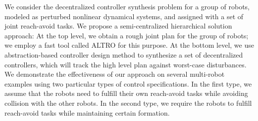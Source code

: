 
We consider the decentralized controller synthesis problem for a group of robots, modeled as perturbed nonlinear dynamical systems, and assigned with a set of joint reach-avoid tasks.
We propose a semi-centralized hierarchical solution approach:
At the top level, we obtain a rough joint plan for the group of robots; we employ a fast tool called ALTRO for this purpose.
At the bottom level, we use abstraction-based controller design method to synthesize a set of decentralized controllers, which will track the high level plan against worst-case disturbances.
We demonstrate the effectiveness of our approach on several multi-robot examples using two particular types of control specifications.
In the first type, we assume that the robots need to fulfill their own reach-avoid tasks while avoiding collision with the other robots.
In the second type, we require the robots to fulfill reach-avoid tasks while maintaining certain formation.